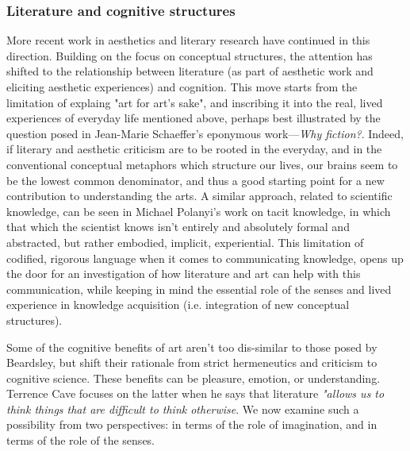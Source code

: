 \documentclass{article}
\begin{document}
\subsubsection{Literature and cognitive structures}

More recent work in aesthetics and literary research have continued in this direction. Building on the focus on conceptual structures, the attention has shifted to the relationship between literature (as part of aesthetic work and eliciting aesthetic experiences) and cognition. This move starts from the limitation of explaing "art for art's sake", and inscribing it into the real, lived experiences of everyday life mentioned above, perhaps best illustrated by the question posed in Jean-Marie Schaeffer's eponymous work—\emph{Why fiction?}. Indeed, if literary and aesthetic criticism are to be rooted in the everyday, and in the conventional conceptual metaphors which structure our lives, our brains seem to be the lowest common denominator, and thus a good starting point for a new contribution to understanding the arts. A similar approach, related to scientific knowledge, can be seen in Michael Polanyi's work on tacit knowledge, in which that which the scientist knows isn't entirely and absolutely formal and abstracted, but rather embodied, implicit, experiential. This limitation of codified, rigorous language when it comes to communicating knowledge, opens up the door for an investigation of how literature and art can help with this communication, while keeping in mind the essential role of the senses and lived experience in knowledge acquisition (i.e. integration of new conceptual structures)\cite{polanyi_tacit_2009}.

Some of the cognitive benefits of art aren't too dis-similar to those posed by Beardsley, but shift their rationale from strict hermeneutics and criticism to cognitive science. These benefits can be pleasure, emotion, or understanding. Terrence Cave focuses on the latter when he says that literature \emph{"allows us to think things that are difficult to think otherwise}. We now examine such a possibility from two perspectives: in terms of the role of imagination, and in terms of the role of the senses.
\end{document}
